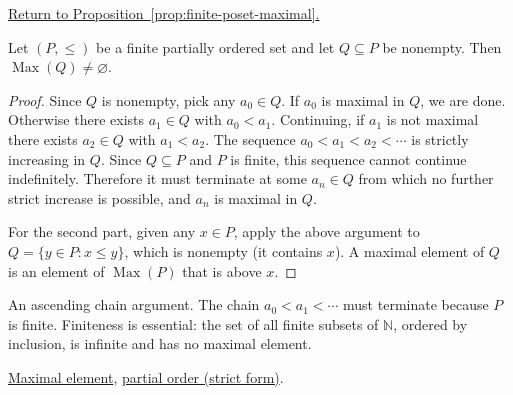 
\newpage
{}
\label{prf:finite-poset-maximal}

\begin{remark*}[Return]
\hyperref[prop:finite-poset-maximal]{Return to Proposition~\ref*{prop:finite-poset-maximal}.}
\end{remark*}

\begin{theorem*}
Let $(P, \leq)$ be a finite partially ordered set and let $Q \subseteq P$
be nonempty.  Then $\operatorname{Max}(Q) \neq \varnothing$.
\end{theorem*}

\begin{proof}[Proof]
Since $Q$ is nonempty, pick any $a_0 \in Q$.  If $a_0$ is maximal in $Q$,
we are done.  Otherwise there exists $a_1 \in Q$ with $a_0 < a_1$.
Continuing, if $a_1$ is not maximal there exists $a_2 \in Q$ with
$a_1 < a_2$.  The sequence $a_0 < a_1 < a_2 < \cdots$ is strictly
increasing in $Q$.  Since $Q \subseteq P$ and $P$ is finite, this sequence
cannot continue indefinitely.  Therefore it must terminate at some
$a_n \in Q$ from which no further strict increase is possible, and $a_n$
is maximal in $Q$.

For the second part, given any $x \in P$, apply the above argument to
$Q = \{y \in P : x \leq y\}$, which is nonempty (it contains $x$).  A
maximal element of $Q$ is an element of $\operatorname{Max}(P)$ that is
above $x$.
\end{proof}

\begin{remark*}
An ascending chain argument.  The chain $a_0 < a_1 < \cdots$ must
terminate because $P$ is finite.  Finiteness is essential: the set of
all finite subsets of $\mathbb{N}$, ordered by inclusion, is infinite
and has no maximal element.
\end{remark*}

\begin{remark*}[Dependencies]
\hyperref[def:maximal-element]{Maximal element},
\hyperref[def:partial-order]{partial order (strict form)}.
\end{remark*}

